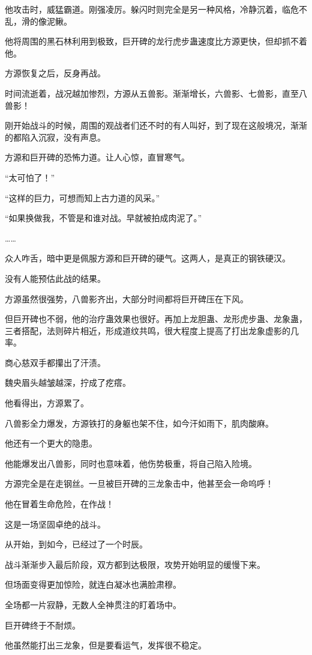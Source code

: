 \begin{this_body}
他攻击时，威猛霸道。刚强凌厉。躲闪时则完全是另一种风格，冷静沉着，临危不乱，滑的像泥鳅。

他将周围的黑石林利用到极致，巨开碑的龙行虎步蛊速度比方源更快，但却抓不着他。

方源恢复之后，反身再战。

时间流逝着，战况越加惨烈，方源从五兽影。渐渐增长，六兽影、七兽影，直至八兽影！

刚开始战斗的时候，周围的观战者们还不时的有人叫好，到了现在这般境况，渐渐的都陷入沉寂，没有声息。

方源和巨开碑的恐怖力道。让人心惊，直冒寒气。

“太可怕了！”

“这样的巨力，可想而知上古力道的风采。”

“如果换做我，不管是和谁对战。早就被拍成肉泥了。”

……

众人咋舌，暗中更是佩服方源和巨开碑的硬气。这两人，是真正的钢铁硬汉。

没有人能预估此战的结果。

方源虽然很强势，八兽影齐出，大部分时间都将巨开碑压在下风。

但巨开碑也不弱，他的治疗蛊效果也很好。再加上龙胆蛊、龙形虎步蛊、龙象蛊，三者搭配，法则碎片相近，形成道纹共鸣，很大程度上提高了打出龙象虚影的几率。

商心慈双手都攥出了汗渍。

魏央眉头越皱越深，拧成了疙瘩。

他看得出，方源累了。

八兽影全力爆发，方源铁打的身躯也架不住，如今汗如雨下，肌肉酸麻。

他还有一个更大的隐患。

他能爆发出八兽影，同时也意味着，他伤势极重，将自己陷入险境。

方源完全是在走钢丝。一旦被巨开碑的三龙象击中，他甚至会一命呜呼！

他在冒着生命危险，在作战！

这是一场坚固卓绝的战斗。

从开始，到如今，已经过了一个时辰。

战斗渐渐步入最后阶段，双方都到达极限，攻势开始明显的缓慢下来。

但场面变得更加惊险，就连白凝冰也满脸肃穆。

全场都一片寂静，无数人全神贯注的盯着场中。

巨开碑终于不耐烦。

他虽然能打出三龙象，但是要看运气，发挥很不稳定。


\end{this_body}
